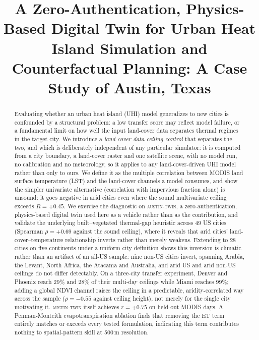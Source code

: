 \documentclass[conference]{IEEEtran}
\title{A Zero-Authentication, Physics-Based Digital Twin for Urban Heat Island
Simulation and Counterfactual Planning: A Case Study of Austin, Texas}
\author{
\IEEEauthorblockN{Abhiram Donepudi}
\IEEEauthorblockA{Westwood High School, Round Rock, TX\\
\texttt{abhiram.donepudi@gmail.com}}
}
\begin{document}
\maketitle

\begin{abstract}
Evaluating whether an urban heat island (UHI) model generalizes to new
cities is confounded by a structural problem: a low transfer score may
reflect model failure, or a fundamental limit on how well the input
land-cover data separates thermal regimes in the target city. We introduce
a \emph{land-cover data-ceiling control} that separates the two, and which
is deliberately independent of any particular simulator: it is computed
from a city boundary, a land-cover raster and one satellite scene, with no
model run, no calibration and no meteorology, so it applies to any
land-cover-driven UHI model rather than only to ours. We define it as the
multiple correlation between MODIS land surface temperature (LST) and the
land-cover channels a model consumes, and show the simpler univariate
alternative (correlation with impervious fraction alone) is unsound: it
goes negative in arid cities even where the sound multivariate ceiling
exceeds $R{=}{+}0.45$. We exercise the diagnostic on
\textsc{austin-twin}, a zero-authentication, physics-based digital twin
used here as a vehicle rather than as the contribution,
and validate the underlying built--vegetated thermal-gap heuristic across
49 US cities (Spearman $\rho{=}{+}0.69$ against the sound ceiling), where
it reveals that arid cities' land-cover--temperature relationship inverts
rather than merely weakens. Extending to 28 cities on five continents under
a uniform city definition shows this inversion is climatic rather than an
artifact of an all-US sample: nine non-US cities invert, spanning Arabia,
the Levant, North Africa, the Atacama and Australia, and arid US and arid
non-US ceilings do not differ detectably. On a three-city transfer experiment,
Denver and Phoenix reach 29\% and 28\% of their multi-day ceilings while
Miami reaches 99\%; adding a global NDVI channel raises the ceiling in a
predictable, aridity-correlated way across the sample
($\rho{=}{-}0.55$ against ceiling height), not merely for the single city
motivating it. \textsc{austin-twin} itself achieves $r{=}{+}0.75$ on
held-out MODIS days. A Penman-Monteith evapotranspiration ablation finds
that removing the ET term entirely matches or exceeds every tested
formulation, indicating this term contributes nothing to spatial-pattern
skill at 500\,m resolution.
\end{abstract}
\end{document}
